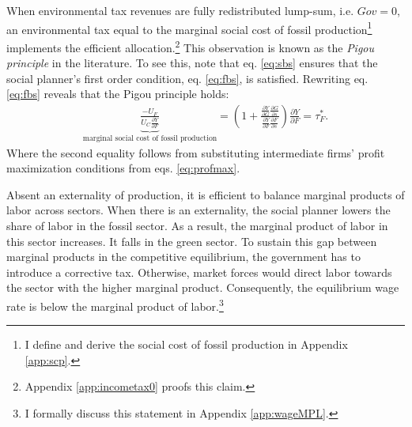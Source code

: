 When environmental tax revenues are fully redistributed lump-sum, i.e. $Gov=0$, an environmental tax equal to the marginal social cost of fossil production\footnote{ I define and derive the social cost of fossil production in Appendix  \ref{app:scp}.} implements the efficient allocation.\footnote{Appendix \ref{app:incometax0} proofs this claim.} This observation is known as the \textit{Pigou principle} in the literature. 
To see this, note that eq. \eqref{eq:sbs} ensures that the social planner's first order condition, eq. \eqref{eq:fbs}, is satisfied. 
Rewriting eq. \eqref{eq:fbs} reveals that the Pigou principle holds: %
\begin{align}
\underbrace{\frac{-U_F}{U_C\frac{\partial Y}{\partial F}}}_{\text{marginal social cost of fossil production}}=\left(1+\frac{\frac{\partial Y}{\partial G}\frac{\partial G}{\partial s}}{\frac{\partial Y}{\partial F}\frac{\partial F}{\partial s}}\right)\frac{\partial Y}{\partial F}=\tau^*_F.
\end{align}
Where the second equality follows from substituting intermediate firms' profit maximization conditions from eqs. \eqref{eq:profmax}. %


Absent an externality of production, it is efficient to balance marginal products of labor across sectors.
When there is an externality, the social planner lowers the share of labor in the fossil sector. As a result, the marginal product of labor in this sector increases. It falls in the green sector. To sustain this gap between marginal products in the competitive equilibrium, the government has to introduce a corrective tax. Otherwise, market forces would direct labor towards the sector with the higher marginal product. Consequently, the equilibrium wage rate is below the marginal product of labor.\footnote{ I formally discuss this statement in Appendix \ref{app:wageMPL}.} 

